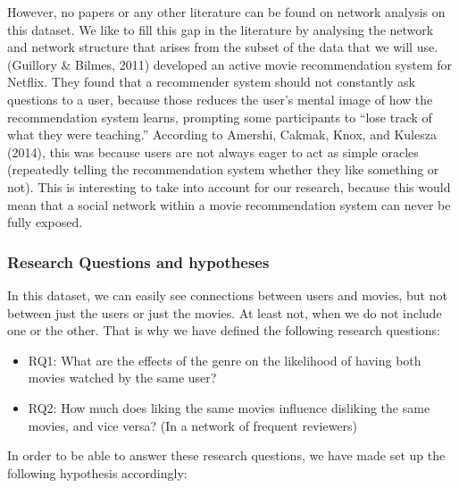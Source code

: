 \documentclass[
  english,
  man,floatsintext]{apa6}
\providecommand{\tightlist}{%
  \setlength{\itemsep}{0pt}\setlength{\parskip}{0pt}}
\begin{document}
However, no papers or any other literature can be found on network analysis on this dataset. We like to fill this gap in the literature by analysing the network and network structure that arises from the subset of the data that we will use.
(Guillory \& Bilmes, 2011) developed an active movie recommendation system for Netflix. They found that a recommender system should not constantly ask questions to a user, because those reduces the user's mental image of how the recommendation system learns, prompting some participants to ``lose track of what they were teaching.'' According to Amershi, Cakmak, Knox, and Kulesza (2014), this was because users are not always eager to act as simple oracles (repeatedly telling the recommendation system whether they like something or not). This is interesting to take into account for our research, because this would mean that a social network within a movie recommendation system can never be fully exposed.

\hypertarget{research-questions-and-hypotheses}{%
\subsubsection{Research Questions and hypotheses}\label{research-questions-and-hypotheses}}

In this dataset, we can easily see connections between users and movies, but not between just the users or just the movies. At least not, when we do not include one or the other. That is why we have defined the following research questions:

\begin{itemize}
\tightlist
\item
  RQ1: What are the effects of the genre on the likelihood of having both movies watched by the same user?
\item
  RQ2: How much does liking the same movies influence disliking the same movies, and vice versa? (In a network of frequent reviewers)
\end{itemize}

In order to be able to answer these research questions, we have made set up the following hypothesis accordingly:
\end{document}
